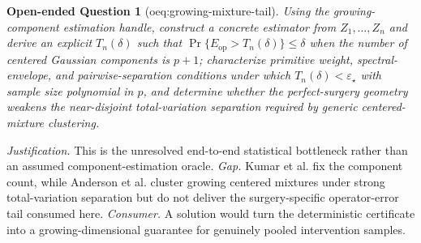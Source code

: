 \documentclass{article}
\newtheorem{openendedquestion}{Open-ended Question}
\begin{document}
\begin{openendedquestion}[oeq:growing-mixture-tail]\label{oeq:growing-mixture-tail}
Using the growing-component estimation handle, construct a concrete estimator from \(Z_1,\ldots,Z_n\) and derive an explicit \(T_n(\delta)\) such that \(\Pr\{E_{\mathrm{op}}>T_n(\delta)\}\le\delta\) when the number of centered Gaussian components is \(p+1\); characterize primitive weight, spectral-envelope, and pairwise-separation conditions under which \(T_n(\delta)<\varepsilon_{\star}\) with sample size polynomial in \(p\), and determine whether the perfect-surgery geometry weakens the near-disjoint total-variation separation required by generic centered-mixture clustering.
\end{openendedquestion}
\par\smallskip\noindent \textit{Justification.} This is the unresolved end-to-end statistical bottleneck rather than an assumed component-estimation oracle. \textit{Gap.} Kumar et al. fix the component count, while Anderson et al. cluster growing centered mixtures under strong total-variation separation but do not deliver the surgery-specific operator-error tail consumed here. \textit{Consumer.} A solution would turn the deterministic certificate into a growing-dimensional guarantee for genuinely pooled intervention samples.
\end{document}
